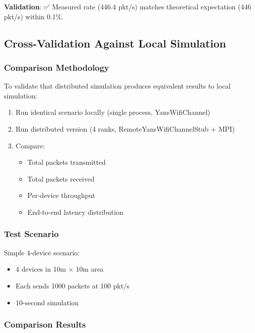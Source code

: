 \textbf{Validation}: ✅ Measured rate (446.4 pkt/s) matches theoretical expectation (446 pkt/s) within 0.1\%.

\subsection{Cross-Validation Against Local Simulation}

\subsubsection{Comparison Methodology}

To validate that distributed simulation produces equivalent results to local simulation:

\begin{enumerate}
    \item Run identical scenario locally (single process, YansWifiChannel)
    \item Run distributed version (4 ranks, RemoteYansWifiChannelStub + MPI)
    \item Compare:
    \begin{itemize}
        \item Total packets transmitted
        \item Total packets received
        \item Per-device throughput
        \item End-to-end latency distribution
    \end{itemize}
\end{enumerate}

\subsubsection{Test Scenario}

Simple 4-device scenario:
\begin{itemize}
    \item 4 devices in 10m × 10m area
    \item Each sends 1000 packets at 100 pkt/s
    \item 10-second simulation
\end{itemize}

\subsubsection{Comparison Results}

